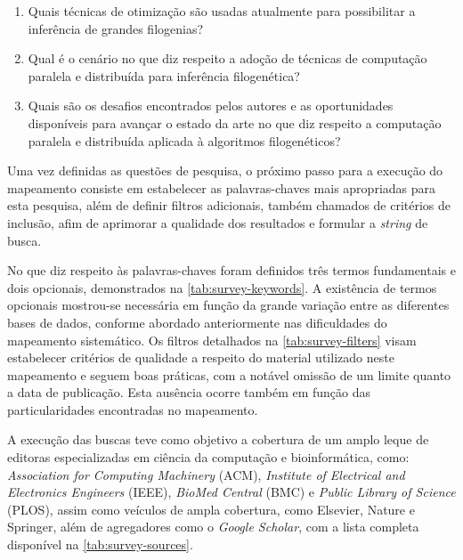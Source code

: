 \documentclass[english,brazilian]{UNISINOSmonografia} %
\begin{document}
\begin{enumerate}[label=Questão~\arabic*:,itemindent=*]
	
	
	\item Quais técnicas de otimização são usadas atualmente para possibilitar a inferência de grandes filogenias?
	
	\item Qual é o cenário no que diz respeito a adoção de técnicas de computação paralela e distribuída para inferência filogenética?
	
	\item Quais são os desafios encontrados pelos autores e as oportunidades disponíveis para avançar o estado da arte no que diz respeito a computação paralela e distribuída aplicada à algoritmos filogenéticos?
	
\end{enumerate}


Uma vez definidas as questões de pesquisa, o próximo passo para a execução do mapeamento consiste em estabelecer as palavras-chaves mais apropriadas para esta pesquisa, além de definir filtros adicionais, também chamados de critérios de inclusão, afim de aprimorar a qualidade dos resultados e formular a \textit{string} de busca.


No que diz respeito às palavras-chaves foram definidos três termos fundamentais e dois opcionais, demonstrados na \autoref{tab:survey-keywords}.
A existência de termos opcionais mostrou-se necessária em função da grande variação entre as diferentes bases de dados, conforme abordado anteriormente nas dificuldades do mapeamento sistemático.
Os filtros detalhados na \autoref{tab:survey-filters} visam estabelecer critérios de qualidade a respeito do material utilizado neste mapeamento e seguem boas práticas, com a notável omissão de um limite quanto a data de publicação.
Esta ausência ocorre também em função das particularidades encontradas no mapeamento.




A execução das buscas teve como objetivo a cobertura de um amplo leque de editoras especializadas em ciência da computação e bioinformática, como: \textit{Association for Computing Machinery} (ACM), \textit{Institute of Electrical and Electronics Engineers} (IEEE), \textit{BioMed Central} (BMC) e \textit{Public Library of Science} (PLOS), assim como veículos de ampla cobertura, como Elsevier, Nature e Springer, além de agregadores como o \textit{Google Scholar}, com a lista completa disponível na \autoref{tab:survey-sources}.
\end{document}

